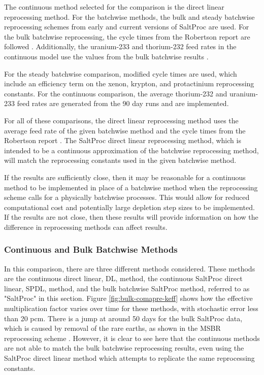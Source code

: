 The continuous method selected for the comparison is the direct linear reprocessing method. For the batchwise methods, the bulk and steady batchwise reprocessing schemes from early and current versions of SaltProc are used. For the bulk batchwise reprocessing, the cycle times from the Robertson report are followed \cite{robertson_conceptual_1971}. Additionally, the uranium-233 and thorium-232 feed rates in the continuous model use the values from the bulk batchwise results \cite{rykhlevskii_advanced_2018}.

For the steady batchwise comparison, modified cycle times are used, which include an efficiency term on the xenon, krypton, and protactinium reprocessing constants. For the continuous comparison, the average thorium-232 and uranium-233 feed rates are generated from the 90 day runs and are implemented.

For all of these comparisons, the direct linear reprocessing method uses the average feed rate of the given batchwise method and the cycle times from the Robertson report \cite{robertson_conceptual_1971}. The SaltProc direct linear reprocessing method, which is intended to be a continuous approximation of the batchwise reprocessing method, will match the reprocessing constants used in the given batchwise method.

If the results are sufficiently close, then it may be reasonable for a continuous method to be implemented in place of a batchwise method when the reprocessing scheme calls for a physically batchwise processes. This would allow for reduced computational cost and potentially large depletion step sizes to be implemented. If the results are not close, then these results will provide information on how the difference in reprocessing methods can affect results.


\subsubsection{Continuous and Bulk Batchwise Methods}
\label{s:bulk}

In this comparison, there are three different methods considered. These methods are the continuous direct linear, DL, method, the continuous SaltProc direct linear, SPDL, method, and the bulk batchwise SaltProc method, referred to as "SaltProc" in this section. Figure \ref{fig:bulk-comapre-keff} shows how the effective multiplication factor varies over time for these methods, with stochastic error less than 20 pcm.
There is a jump at around 50 days for the bulk SaltProc data, which is caused by removal of the rare earths, as shown in the MSBR reprocessing scheme \cite{robertson_conceptual_1971}. However, it is clear to see here that the continuous methods are not able to match the bulk batchwise reprocessing results, even using the SaltProc direct linear method which attempts to replicate the same reprocessing constants.

